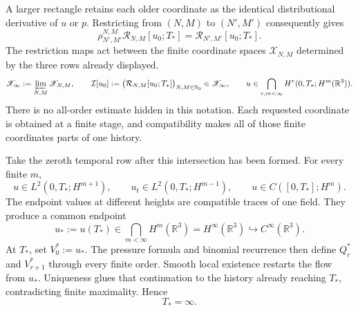 A larger rectangle retains each older coordinate as the identical
distributional derivative of \(u\) or \(p\).  Restricting from
\((N,M)\) to \((N',M')\) consequently gives
\[
 \rho_{N',M'}^{N,M}\mathcal R_{N,M}[u_0;T_*]
 =\mathcal R_{N',M'}[u_0;T_*].
\]
The restriction maps act between the finite coordinate spaces
\(\mathscr X_{N,M}\) determined by the three rows already displayed.
\[
 \mathscr X_\infty:=\varprojlim_{N,M}\mathscr X_{N,M},
 \qquad
 \mathcal I[u_0]
 :=\bigl(\mathcal R_{N,M}[u_0;T_*]\bigr)_{N,M\in\mathbb N_0}
 \in\mathscr X_\infty,
 \qquad
 u\in\bigcap_{r,m<\infty}H^r(0,T_*;H^m(\mathbb R^3)).
\]
There is no all-order estimate hidden in this notation.  Each requested
coordinate is obtained at a finite stage, and compatibility makes all of
those finite coordinates parts of one history.

Take the zeroth temporal row after this intersection has been formed.  For
every finite \(m\),
\[
 u\in L^2(0,T_*;H^{m+1}),
 \qquad
 u_t\in L^2(0,T_*;H^{m-1}),
 \qquad
 u\in C([0,T_*];H^m).
\]
The endpoint values at different heights are compatible traces of one field.
They produce a common endpoint
\[
 u_*:=u(T_*)\in\bigcap_{m<\infty}H^m(\mathbb R^3)
 =H^\infty(\mathbb R^3)
 \hookrightarrow C^\infty(\mathbb R^3).
\]
At \(T_*\), set \(V_0^*:=u_*\).  The pressure formula and binomial recurrence
then define \(Q_r^*\) and \(V_{r+1}^*\) through every finite order.  Smooth
local existence restarts the flow from \(u_*\).  Uniqueness glues that
continuation to the history already reaching \(T_*\), contradicting finite
maximality.
Hence
\[
 T_*=\infty.
\]


